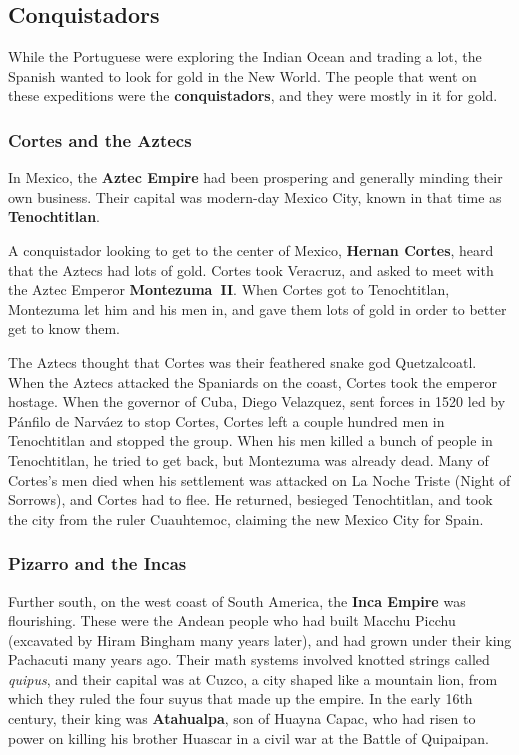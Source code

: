\subsection*{Conquistadors}

While the Portuguese were exploring the Indian Ocean and trading a lot,
the Spanish wanted to look for gold in the New World.
The people that went on these expeditions were the \textbf{conquistadors},
and they were mostly in it for gold.

\subsubsection*{Cortes and the Aztecs}

In Mexico, the \textbf{Aztec Empire} had been prospering and generally minding their own business.
Their capital was modern-day Mexico City, known in that time as \textbf{Tenochtitlan}.

A conquistador looking to get to the center of Mexico,
\textbf{Hernan Cortes}, heard that the Aztecs had lots of gold.
Cortes took Veracruz, and asked to meet with the Aztec Emperor \textbf{Montezuma~II}.
When Cortes got to Tenochtitlan, Montezuma let him and his men in,
and gave them lots of gold in order to better get to know them.

The Aztecs thought that Cortes was their feathered snake god Quetzalcoatl.
When the Aztecs attacked the Spaniards on the coast, Cortes took the emperor hostage.
When the governor of Cuba, Diego Velazquez, sent forces in 1520 led by P\'anfilo de Narv\'aez to stop Cortes,
Cortes left a couple hundred men in Tenochtitlan and stopped the group.
When his men killed a bunch of people in Tenochtitlan,
he tried to get back, but Montezuma was already dead.
Many of Cortes's men died when his settlement was attacked on La Noche Triste (Night of Sorrows),
and Cortes had to flee.
He returned, besieged Tenochtitlan, and took the city from the ruler Cuauhtemoc,
claiming the new Mexico City for Spain.

\subsubsection*{Pizarro and the Incas}

Further south, on the west coast of South America, the \textbf{Inca Empire} was flourishing.
These were the Andean people who had built Macchu Picchu (excavated by Hiram Bingham many years later),
and had grown under their king Pachacuti many years ago.
Their math systems involved knotted strings called \textit{quipus},
and their capital was at Cuzco, a city shaped like a mountain lion,
from which they ruled the four suyus that made up the empire.
In the early 16th century, their king was \textbf{Atahualpa}, son of Huayna Capac,
who had risen to power on killing his brother Huascar in a civil war at the Battle of Quipaipan.

